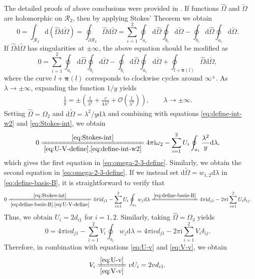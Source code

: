 \documentclass[11pt,reqno]{amsart}
\newcommand{\ii}{\mathrm{i}}
\newcommand{\dd}{\mathrm{d}}
\numberwithin{equation}{section}
\begin{document}
The detailed proofs of above conclusions were provided in \cite{BelokolosBEI-94,CaliniI-05-VFE,FritzH-2003-Algebro-Geometric}.
If functions $\hat{\Omega}$ and $\tilde{\Omega}$ are holomorphic on  $\mathcal{R}_2$, then by applying Stokes' Theorem we obtain
	\begin{equation}\nonumber
		0=\int_{\mathcal{R}_2}\dd (\hat{\Omega}\dd \tilde{\Omega})=\oint_{\partial \mathcal{R}_2}  \hat{\Omega}\dd \tilde{\Omega}=\sum_{i=1}^{2} \oint_{a_i} \dd \hat{\Omega} \oint_{b_i} \dd \tilde{\Omega}-\oint_{b_i} \dd \hat{\Omega} \oint_{a_i} \dd \tilde{\Omega}.
	\end{equation}
	If $\hat{\Omega}\dd \tilde{\Omega}$ has singularities at $\pm\infty$, the above equation should be modified as
	\begin{equation}\label{eq:Stokes-int}
		0=\sum_{i=1}^{2} \oint_{a_i} \dd \hat{\Omega} \oint_{b_i} \dd \tilde{\Omega}-\oint_{b_i} \dd \hat{\Omega} \oint_{a_i} \dd \tilde{\Omega}+\oint_{l+\boldsymbol{\pi}(l)}\hat{\Omega}\dd \tilde{\Omega},
	\end{equation}
	where the curve $l+\boldsymbol{\pi}(l)$ corresponds to clockwise cycles around $\infty^{\pm}$.
	As $\lambda \rightarrow \pm \infty$, expanding the function $1/y$ yields
	\begin{equation}\nonumber
		\begin{split}
			\frac{1}{y}=\pm\left(\frac{1}{\lambda^3}+\frac{v}{4\lambda^5}+\mathcal{O}\left(\frac{1}{\lambda^7}\right)\right), \qquad \lambda \rightarrow \pm \infty.
		\end{split}
	\end{equation}
	Setting $\hat{\Omega}=\Omega_2$ and $\dd \tilde{\Omega}=\lambda^2/y \dd \lambda$ and combining with equations \eqref{eq:define-int-w2} and \eqref{eq:Stokes-int}, we obtain 
	\begin{equation}\nonumber
		0\xlongequal[\eqref{eq:U-V-define},\eqref{eq:define-int-w2}]{\eqref{eq:Stokes-int}} 4\pi \ii \omega_2-\sum_{i=1}^2U_i \oint_{a_i}\frac{\lambda^2}{y}\dd \lambda,
	\end{equation}
	which gives the first equation in \eqref{eq:omega-2-3-define}. 
	Similarly, we obtain the second equation in \eqref{eq:omega-2-3-define}.
	If we instead set $\dd \tilde{\Omega}=w_{1,2}\dd \lambda$ in \eqref{eq:define-basis-B}, it is straightforward to verify that
	\begin{equation}\label{eq:U-v}
		0\xlongequal[\eqref{eq:define-basis-B},\eqref{eq:U-V-define}]{\eqref{eq:Stokes-int}}4\pi \ii d_{j1}-\sum_{i=1}^2U_i \oint_{a_i}w_j\dd \lambda\xlongequal{\eqref{eq:define-basis-B}}4\pi \ii d_{j1}-2\pi \ii \sum_{i=1}^2U_i \delta_{ij}.
	\end{equation}
	Thus, we obtain $U_i=2d_{i1}$ for $i=1,2$.
	Similarly, taking $\hat{\Omega}=\Omega_3$ yields
	\begin{equation}\label{eq:V-v}
		0=4\pi \ii v d_{j1}-\sum_{i=1}^2V_i \oint_{a_i}w_j\dd \lambda = 4\pi \ii v d_{j1}-2\pi \ii \sum_{i=1}^2V_i \delta_{ij}.
	\end{equation}
	Therefore, in combination with equations \eqref{eq:U-v} and \eqref{eq:V-v}, we obtain 
	\begin{equation}\label{eq:U-V-v}
		V_i\xlongequal[\eqref{eq:V-v}]{\eqref{eq:U-v}}vU_i=2vd_{i1}.
\end{equation}
\end{document}
